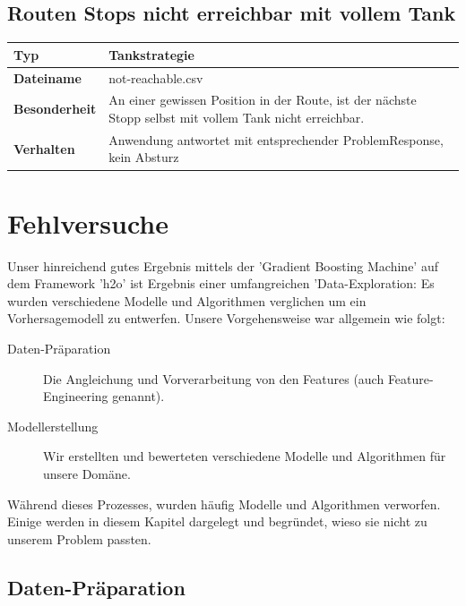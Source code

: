 \documentclass[
ngerman          %
,a4paper          %
,11pt
,pdftex
]{report}
\begin{document}
\subsection{Routen Stops nicht erreichbar mit vollem Tank}

\begin{table}[H]
	\centering
	\begin{tabular}{l p{12cm}}
		\textbf{Typ} & \textbf{Tankstrategie} \\ 
		\hline
		\hline
		\textbf{Dateiname} & not-reachable.csv \\
        \textbf{Besonderheit} & An einer gewissen Position in der Route, ist der nächste Stopp selbst mit vollem Tank nicht erreichbar. \\
        \textbf{Verhalten} & Anwendung antwortet mit entsprechender ProblemResponse, kein Absturz \\
		\hline 
	\end{tabular}
\end{table} 
\section{Fehlversuche}

Unser hinreichend gutes Ergebnis mittels der 'Gradient Boosting Machine' auf dem Framework 'h2o' ist Ergebnis einer umfangreichen 'Data-Exploration: Es wurden verschiedene Modelle und Algorithmen verglichen um ein Vorhersagemodell zu entwerfen. Unsere Vorgehensweise war allgemein wie folgt:

\begin{description}
	\item[Daten-Präparation]
Die Angleichung und Vorverarbeitung von den Features (auch Feature-Engineering genannt).
	\item[Modellerstellung] 
	Wir erstellten und bewerteten verschiedene Modelle und Algorithmen für unsere Domäne.
\end{description}

Während dieses Prozesses, wurden häufig Modelle und Algorithmen verworfen. Einige werden in diesem Kapitel dargelegt und begründet, wieso sie nicht zu unserem Problem passten.

\subsection{Daten-Präparation}
\end{document}

